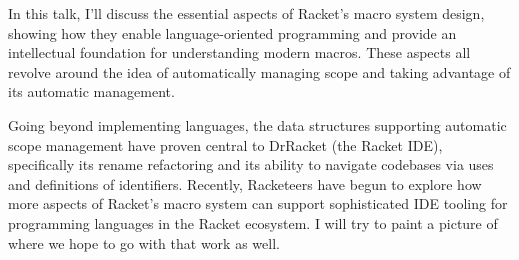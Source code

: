 \documentclass[runningheads]{llncs}
\begin{document}
In this talk, I'll discuss the essential aspects of Racket's macro
system design, showing how they enable language-oriented programming
and provide an intellectual foundation for understanding modern
macros. These aspects all revolve around the idea of automatically
managing scope and taking advantage of its automatic management.

Going beyond implementing languages, the data structures supporting
automatic scope management have proven central to DrRacket (the Racket
IDE), specifically its rename refactoring and its ability to navigate
codebases via uses and definitions of identifiers. Recently,
Racketeers have begun to explore how more aspects of Racket's macro
system can support sophisticated IDE tooling for programming languages
in the Racket ecosystem. I will try to paint a picture of where we
hope to go with that work as well.
\end{document}
